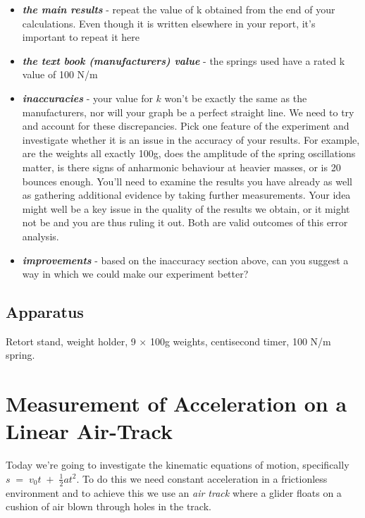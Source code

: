 \documentclass[
  letterpaper,
  DIV=11,
  numbers=noendperiod]{scrreprt}
\begin{document}
\begin{itemize}
\item
  \textbf{\emph{the main results}} - repeat the value of k obtained from
  the end of your calculations. Even though it is written elsewhere in
  your report, it's important to repeat it here
\item
  \textbf{\emph{the text book (manufacturers) value}} - the springs used
  have a rated k value of 100 N/m
\item
  \textbf{\emph{inaccuracies}} - your value for \(k\) won't be exactly
  the same as the manufacturers, nor will your graph be a perfect
  straight line. We need to try and account for these discrepancies.
  Pick one feature of the experiment and investigate whether it is an
  issue in the accuracy of your results. For example, are the weights
  all exactly 100g, does the amplitude of the spring oscillations
  matter, is there signs of anharmonic behaviour at heavier masses, or
  is 20 bounces enough. You'll need to examine the results you have
  already as well as gathering additional evidence by taking further
  measurements. Your idea might well be a key issue in the quality of
  the results we obtain, or it might not be and you are thus ruling it
  out. Both are valid outcomes of this error analysis.
\item
  \textbf{\emph{improvements}} - based on the inaccuracy section above,
  can you suggest a way in which we could make our experiment better?
\end{itemize}

\section{Apparatus}\label{apparatus-4}

Retort stand, weight holder, 9 \(\times\) 100g weights, centisecond
timer, 100 N/m spring.


\chapter{Measurement of Acceleration on a Linear
Air-Track}\label{measurement-of-acceleration-on-a-linear-air-track}

Today we're going to investigate the kinematic equations of motion,
specifically \(s \; = \; v_0 t \; + \; \frac{1}{2} a t^2\). To do this
we need constant acceleration in a frictionless environment and to
achieve this we use an \emph{air track} where a glider floats on a
cushion of air blown through holes in the track.
\end{document}
